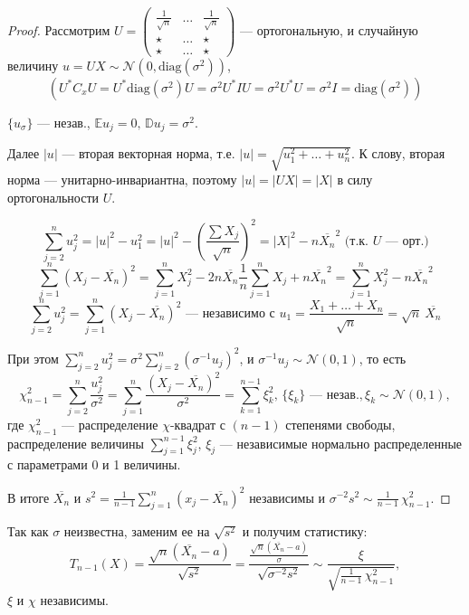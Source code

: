 \begin{enumerate}
\begin{proof}
		Рассмотрим $U = \left(\begin{matrix} \frac1{\sqrt{n}} & \dots & \frac1{\sqrt{n}} \\[-0 pt] \star & \dots & \star \\[-0 pt] \star & \dots & \star \end{matrix}\right)$ --- ортогональную, и случайную величину $u = UX \sim \mathcal{N}(0, \text{diag}(\sigma^2))$, 
		\[ \left( U^{*} C_x U = U^{*}\text{diag}(\sigma^2)U = \sigma^2 U^{*} I U = \sigma^2 U^{*} U = \sigma^2 I = \text{diag}(\sigma^2) \right) \]
		
		$\{ u_{\sigma} \}$ --- незав., $\mathbb{E} u_j = 0, \, \mathbb{D} u_j = \sigma^2$.
		
		Далее $|u|$ --- вторая векторная норма, т.е. $|u| = \sqrt{u_1^2 + \ldots + u_n^2}$. К слову, вторая норма --- унитарно-инвариантна, поэтому $|u| = |UX| = |X|$ в силу ортогональности $U$.
		
		\[ \sum_{j=2}^n u_j^2 = |u|^2 - u_1^2 = |u|^2 - \left( \frac{\sum X_j}{\sqrt{n}} \right)^2 = |X|^2 - n\overline{X_n}^2 \text{ (т.к. $U$ --- орт.)} \]
		\[ \sum_{j=1}^n (X_j - \overline{X_n})^2 = \sum_{j=1}^n X_j^2 - 2n \overline{X_n} \frac{1}{n} \sum_{j=1}^n X_j + n\overline{X_n}^2 = \sum_{j=1}^n X_j^2 - n\overline{X_n}^2 \]
		\[ \sum_{j=2}^n u_j^2 = \sum_{j=1}^n (X_j - \overline{X_n})^2 \text{ --- независимо с } u_1 = \frac{X_1 + \ldots + X_n}{\sqrt{n}} = \sqrt{n}\ \overline{X_n} \]
		
		При этом $\sum_{j=2}^n u_j^2 = \sigma^2 \sum_{j=2}^n (\sigma^{-1} u_j)^2$, и $\sigma^{-1} u_j \sim \mathcal{N}(0, 1)$, то есть
        \[ \chi_{n-1}^2 = \sum_{j=2}^n \frac{u_j^2}{\sigma^2} = \sum_{j=1}^{n} \frac{(X_j - \overline{X_n})^2}{\sigma^2} = \sum_{k=1}^{n-1} \xi_k^2, \, \{ \xi_k \} \text{ --- незав.}, \xi_k \sim \mathcal{N}(0, 1), \]
        где $\chi_{n-1}^2$ --- распределение $\chi$-квадрат с $(n-1)$ степенями свободы, распределение величины $\sum_{j=1}^{n-1} \xi_j^2$, $\xi_j$ --- независимые нормально распределенные с параметрами 0 и 1 величины.
		
		В итоге $\overline{X_n}$ и $s^2 = \frac1{n-1} \sum_{j=1}^n (x_j - \overline{X_n})^2$ независимы и $\sigma^{-2}s^2 \sim \frac1{n-1}\,\chi_{n-1}^2$.
	\end{proof}
	
	Так как $\sigma$ неизвестна, заменим ее на $\sqrt{s^2}$ и получим статистику:
    \[ T_{n-1}(X) = \frac{\sqrt{n}(\overline{X_n} - a)}{\sqrt{s^2}} = \frac{\frac{\sqrt{n}(\overline{X_n} - a)}{\sigma}}{\sqrt{\sigma^{-2} s^2}} \sim \frac{\xi}{\sqrt{\frac1{n-1}\,\chi^2_{n-1}}}, \]
	$\xi$ и $\chi$ независимы.
	

\end{enumerate}
